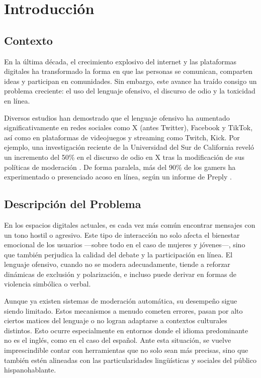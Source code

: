 \chapter{Introducción}

\section{Contexto}

En la última década, el crecimiento explosivo del internet y las plataformas digitales ha transformado la forma en que las personas se comunican, comparten ideas y participan en comunidades. Sin embargo, este avance ha traído consigo un problema creciente: el uso del lenguaje ofensivo, el discurso de odio y la toxicidad en línea.

Diversos estudios han demostrado que el lenguaje ofensivo ha aumentado significativamente en redes sociales como X (antes Twitter), Facebook y TikTok, así como en plataformas de videojuegos y streaming como Twitch, Kick. Por ejemplo, una investigación reciente de la Universidad del Sur de California reveló un incremento del 50\% en el discurso de odio en X tras la modificación de sus políticas de moderación \cite{hickey2025x}. De forma paralela, más del 90\% de los gamers ha experimentado o presenciado acoso en línea, según un informe de Preply \cite{preply2022games}.

\section{Descripción del Problema}

En los espacios digitales actuales, es cada vez más común encontrar mensajes con un tono hostil o agresivo. Este tipo de interacción no solo afecta el bienestar emocional de los usuarios ---sobre todo en el caso de mujeres y jóvenes---, sino que también perjudica la calidad del debate y la participación en línea. El lenguaje ofensivo, cuando no se modera adecuadamente, tiende a reforzar dinámicas de exclusión y polarización, e incluso puede derivar en formas de violencia simbólica o verbal.

Aunque ya existen sistemas de moderación automática, su desempeño sigue siendo limitado. Estos mecanismos a menudo cometen errores, pasan por alto ciertos matices del lenguaje o no logran adaptarse a contextos culturales distintos. Esto ocurre especialmente en entornos donde el idioma predominante no es el inglés, como en el caso del español. Ante esta situación, se vuelve imprescindible contar con herramientas que no solo sean más precisas, sino que también estén alineadas con las particularidades lingüísticas y sociales del público hispanohablante.


